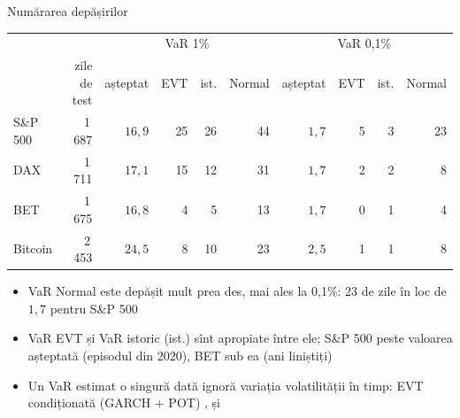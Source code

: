 \begin{frame}{Numărarea depășirilor}
\itemsize{\footnotesize}
\begin{center}
\scriptsize
\begin{tabular}{lr|rrrr|rrrr}
\toprule
& & \multicolumn{4}{c|}{VaR 1\%} & \multicolumn{4}{c}{VaR 0,1\%} \\ & zile de test & așteptat & EVT & ist. & Normal & așteptat & EVT & ist. & Normal \\
\midrule
S\&P 500 & 1\,687 & $16{,}9$ & 25 & 26 & 44 & $1{,}7$ & 5 & 3 & 23 \\
DAX & 1\,711 & $17{,}1$ & 15 & 12 & 31 & $1{,}7$ & 2 & 2 & 8 \\
BET & 1\,675 & $16{,}8$ & 4 & 5 & 13 & $1{,}7$ & 0 & 1 & 4 \\
Bitcoin & 2\,453 & $24{,}5$ & 8 & 10 & 23 & $2{,}5$ & 1 & 1 & 8 \\
\bottomrule
\end{tabular}
\end{center}
\begin{itemize}
    \item VaR Normal este depășit mult prea des, mai ales la 0,1\%: 23 de zile în loc de $1{,}7$ pentru S\&P 500
    \item VaR EVT și VaR istoric (ist.) sînt apropiate între ele; S\&P 500 peste valoarea așteptată (episodul din 2020), BET sub ea (ani liniștiți)
    \item Un VaR estimat o singură dată ignoră variația volatilității în timp: EVT condiționată (GARCH + POT) ,  și 
\end{itemize}
\end{frame}

